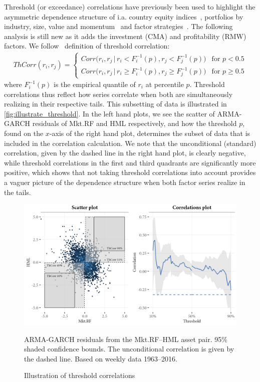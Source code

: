 Threshold (or exceedance) correlations have previously been used to highlight the asymmetric dependence structure of i.a. country equity indices~\autocite{LonginSolnik2001}, portfolios by industry, size, value and momentum~\autocite{AngChen2002} and factor strategies~\autocite{ChristoffersenLanglois2013}. The following analysis is still new as it adds the investment (CMA) and profitability (RMW) factors. We follow~\textcite{ChristoffersenLanglois2013} definition of threshold correlation:
\begin{align}
\label{eq:th_corr}
    ThCorr(r_i, r_j) = 
    \begin{cases} 
        Corr\Big(r_i, r_j \,|\, r_i < F_i^{-1}(p), r_j < F_j^{-1}(p)\Big)  & \text{for } p < 0.5 \\
        Corr\Big(r_i, r_j \,|\, r_i \geq F_i^{-1}(p), r_j \geq F_j^{-1}(p)\Big)  & \text{for } p \geq 0.5
    \end{cases}
\end{align}
where $F_i^{-1}(p)$ is the empirical quantile of $r_i$ at percentile $p$. Threshold correlations thus reflect how series correlate when both are simultaneously realizing in their respective tails. This subsetting of data is illustrated in \autoref{fig:illustrate_threshold}. In the left hand plots, we see the scatter of ARMA-GARCH residuals of Mkt.RF and HML respectively, and how the threshold $p$, found on the $x$-axis of the right hand plot, determines the subset of data that is included in the correlation calculation. We note that the unconditional (standard) correlation, given by the dashed line in the right hand plot, is clearly negative, while threshold correlations in the first and third quadrants are significantly more positive, which shows that not taking threshold correlations into account provides a vaguer picture of the dependence structure when both factor series realize in the tails.

\begin{figure}[H]
  \centering
  \includegraphics[scale=1]{graphics/threshold_explain_res.png}
  \footnotesize
  \caption{Illustration of threshold correlations}
  \begin{longcaption}
    ARMA-GARCH residuals from the Mkt.RF--HML asset pair. 95\% shaded confidence bounds. The unconditional correlation is given by the dashed line. Based on weekly data 1963--2016.
  \end{longcaption}
  \label{fig:illustrate_threshold}
\end{figure}

